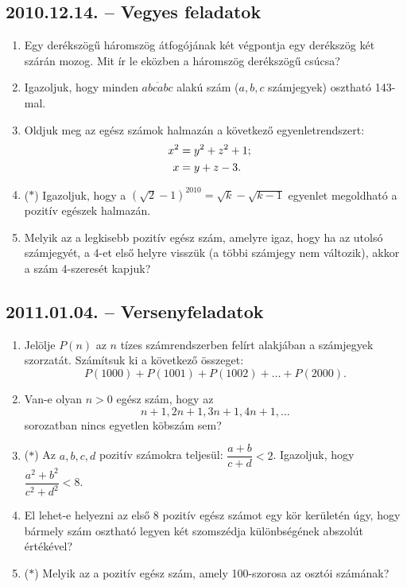 \documentclass{article}
\begin{document}
\subsection*{2010.12.14. -- Vegyes feladatok}
\begin{enumerate}
\item Egy derékszögű háromszög átfogójának két végpontja egy derékszög két szárán mozog. Mit ír le eközben a háromszög derékszögű csúcsa?
\item Igazoljuk, hogy minden $\overline{abcabc}$ alakú szám ($a,b,c$ számjegyek)
osztható 143-mal.
\item Oldjuk meg az egész számok halmazán a következő egyenletrendszert:
\begin{align*}
x^2&=y^2+z^2+1;\cr
x&=y+z-3.
\end{align*}
\item ($*$) Igazoljuk, hogy a $\left(\sqrt{2}-1\right)^{2010}=\sqrt{k}-\sqrt{k-1}$
egyenlet megoldható a pozitív egészek halmazán.
\item Melyik az a legkisebb pozitív egész szám, amelyre igaz, hogy ha az utolsó 
számjegyét, a 4-et első helyre visszük (a többi számjegy nem változik), akkor a szám 4-szeresét kapjuk?
\end{enumerate}

\subsection*{2011.01.04. -- Versenyfeladatok}
\begin{enumerate}
\item Jelölje $P(n)$ az $n$ tízes számrendszerben felírt alakjában a számjegyek szorzatát. Számítsuk ki a következő összeget:
$$P(1000)+P(1001)+P(1002)+\ldots+P(2000).$$
\item Van-e olyan $n>0$ egész szám, hogy az
$$n+1, 2n+1, 3n+1, 4n+1, \ldots$$
sorozatban nincs egyetlen köbszám sem?
\item ($*$) Az $a,b,c,d$ pozitív számokra teljesül: $\dfrac{a+b}{c+d}<2$.
Igazoljuk, hogy $\dfrac{a^2+b^2}{c^2+d^2}<8$.
\item El lehet-e helyezni az első 8 pozitív egész számot egy kör kerületén úgy, hogy bármely szám osztható legyen két szomszédja különbségének abszolút értékével?
\item ($*$) Melyik az a pozitív egész szám, amely 100-szorosa az osztói számának?
\end{enumerate}
\end{document}
